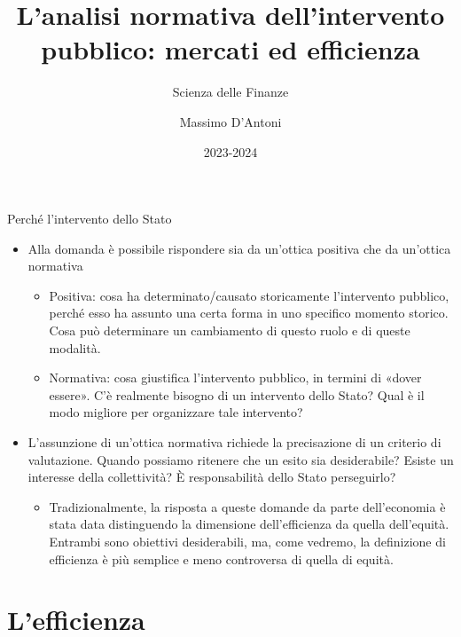 \documentclass[aspectratio=64,11pt]{beamer}
\institute{Università di Siena}
\author{Massimo D'Antoni}
\date{2023-2024}
\title{L'analisi normativa dell'intervento pubblico: mercati ed efficienza}
\subtitle{Scienza delle Finanze}
\begin{document}
\maketitle

\begin{frame}{Perché l'intervento dello Stato}
\begin{itemize}
\item Alla domanda è possibile rispondere sia da un’ottica positiva che da un’ottica normativa
\begin{itemize}
\item \alert{Positiva}: cosa ha determinato/causato storicamente l’intervento pubblico, perché esso ha assunto una certa forma in uno specifico momento storico. Cosa può determinare un cambiamento di questo ruolo e di queste modalità.
\item \alert{Normativa}: cosa giustifica l’intervento pubblico, in termini di «dover essere».  C’è realmente bisogno di un intervento dello Stato? Qual è il modo migliore per organizzare tale intervento?
\end{itemize}
\item L’assunzione di un’ottica normativa richiede la precisazione di un criterio di valutazione. Quando possiamo ritenere che un esito sia desiderabile? Esiste un interesse della collettività? È responsabilità dello Stato perseguirlo?
\begin{itemize}
\item Tradizionalmente, la risposta a queste domande da parte dell’economia è stata data distinguendo la dimensione dell'\alert{efficienza} da quella dell'\alert{equità}. Entrambi sono obiettivi desiderabili, ma, come vedremo, la definizione di efficienza è più semplice e meno controversa di quella di equità.
\end{itemize}
\end{itemize}
\end{frame}

\section{L'efficienza}
\end{document}
